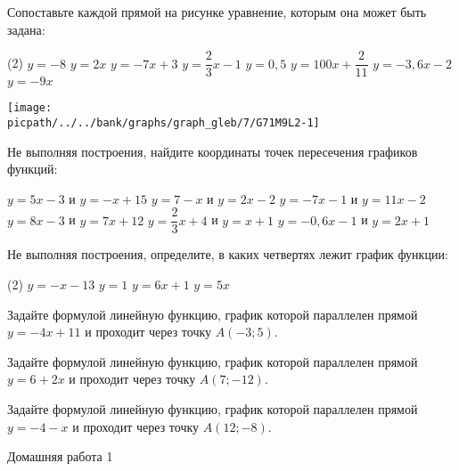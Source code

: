 \begin{class}[number=2]
	\begin{listofex}
		\item Сопоставьте каждой прямой на рисунке уравнение, которым она может быть задана:
		\begin{tasks}(2)
			\task \( y=-8 \)
			\task \( y=2x \)
			\task \( y=-7x+3 \)
			\task \( y=\dfrac{ 2 }{3  }x-1 \)
			\task \( y=0,5 \)
			\task \( y=100x+\dfrac{ 2 }{ 11 } \)
			\task \( y=-3,6x-2 \)
			\task \( y=-9x \)
		\end{tasks}
		\begin{minipage}[t]{\linewidth}
			\texttt{[image: \\picpath/../../bank/graphs/graph\_gleb/7/G71M9L2-1]}
		\end{minipage}
		\item Не выполняя построения, найдите координаты точек пересечения графиков функций:
		\begin{tasks}
			\task \( y=5x-3 \) и \( y=-x+15 \)
			\task \( y=7-x \) и \( y=2x-2 \)
			\task \( y=-7x-1 \) и \( y=11x-2 \)
			\task \( y=8x-3 \) и \( y=7x+12 \)
			\task \( y=\dfrac{ 2 }{ 3 }x+4 \) и \( y=x+1 \)
			\task \( y=-0,6x-1 \) и \( y=2x+1 \)
		\end{tasks}
		\item Не выполняя построения, определите, в каких четвертях лежит график функции:
		\begin{tasks}(2)
			\task \( y=-x-13 \)
			\task \( y=1 \)
			\task \( y=6x+1 \)
			\task \( y=5x \)
		\end{tasks}
		\item Задайте формулой линейную функцию, график которой параллелен прямой \(y=-4x+11\) и проходит через точку \(A(- 3; 5)\).
		\item Задайте формулой линейную функцию, график которой параллелен прямой \(y=6+2x\) и проходит через точку \(A(7; -12)\).
		\item Задайте формулой линейную функцию, график которой параллелен прямой \(y=-4-x\) и проходит через точку \(A(12; -8)\).
	\end{listofex}
\end{class}

\begin{homework}[number=1]
	\begin{listofex}
		\item Домашняя работа 1
	\end{listofex}
\end{homework}

